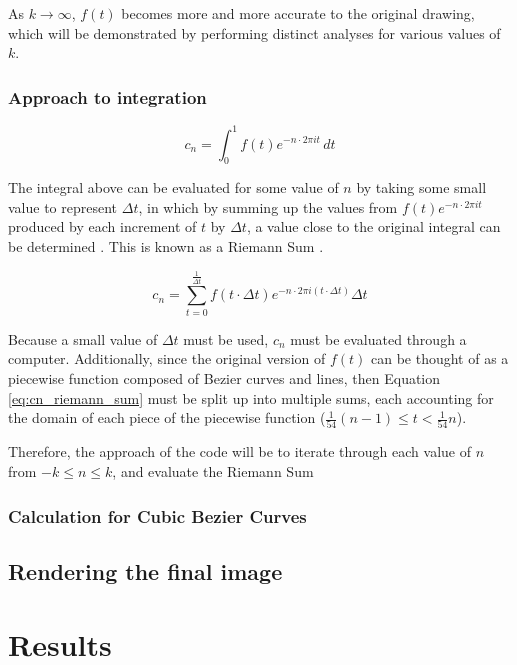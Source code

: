 \documentclass[letterpaper, 12pt]{article}
\begin{document}
As \(k \to \infty\), \(f(t)\) becomes more and more accurate to
the original drawing, which will be demonstrated by performing distinct
analyses for various values of \(k\).

\subsubsection{Approach to integration}

\begin{equation*}
    c_n = \int_{0}^{1} f(t) e^{-n \cdot 2\pi it} \,dt
\end{equation*}

The integral above can be evaluated for some value of \(n\) by
taking some small value to represent \(\Delta t\), in which
by summing up the values from \(f(t) e^{-n \cdot 2\pi it}\)
produced by each increment of \(t\) by \(\Delta t\), a value close
to the original integral can be determined \cite{sandersonWhatFourierSeries2019}.
This is known as a Riemann Sum \cite{RiemannSum2023}.

\begin{equation}
    c_n = \sum_{t = 0}^{\frac{1}{\Delta t}} f(t \cdot \Delta t) e^{-n \cdot 2\pi i(t \cdot \Delta t)} \Delta t
    \label{eq:cn_riemann_sum}
\end{equation}

Because a small value of \(\Delta t\) must be used, \(c_n\) must
be evaluated through a computer. Additionally, since the original
version of \(f(t)\) can be thought of as a piecewise function composed
of Bezier curves and lines, then Equation \ref*{eq:cn_riemann_sum}
must be split up into multiple sums, each accounting for the domain
of each piece of the piecewise function (\(\frac{1}{54}(n-1) \le t < \frac{1}{54}n\)).

Therefore, the approach of the code will be to iterate through
each value of \(n\) from \(-k \le n \le k\), and evaluate
the Riemann Sum 

\subsubsection{Calculation for Cubic Bezier Curves}

\subsection{Rendering the final image}


\section{Results}
\end{document}
